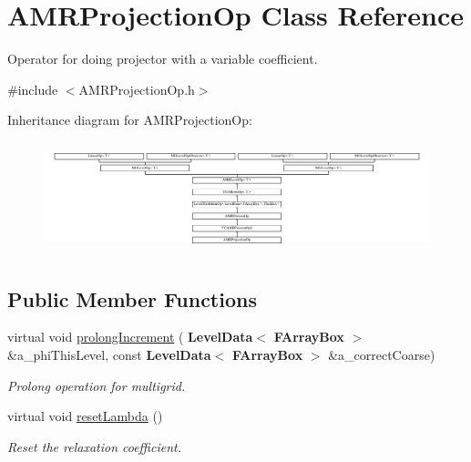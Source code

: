 \hypertarget{class_a_m_r_projection_op}{}\section{A\+M\+R\+Projection\+Op Class Reference}
\label{class_a_m_r_projection_op}


Operator for doing projector with a variable coefficient.  




{\ttfamily \#include $<$A\+M\+R\+Projection\+Op.\+h$>$}

Inheritance diagram for A\+M\+R\+Projection\+Op\+:\begin{figure}[H]
\begin{center}
\leavevmode
\includegraphics[height=3.274854cm]{class_a_m_r_projection_op}
\end{center}
\end{figure}
\subsection*{Public Member Functions}
\begin{DoxyCompactItemize}
\item 
virtual void \hyperlink{class_a_m_r_projection_op_a9a015d1c2ac019517518e88aefecb6fa}{prolong\+Increment} (\textbf{ Level\+Data}$<$ \textbf{ F\+Array\+Box} $>$ \&a\+\_\+phi\+This\+Level, const \textbf{ Level\+Data}$<$ \textbf{ F\+Array\+Box} $>$ \&a\+\_\+correct\+Coarse)
\begin{DoxyCompactList}\small\item\em Prolong operation for multigrid. \end{DoxyCompactList}\item 
\mbox{\label{class_a_m_r_projection_op_a29437ba4ff7458327bf131d1a9c4ae79}} 
virtual void \hyperlink{class_a_m_r_projection_op_a29437ba4ff7458327bf131d1a9c4ae79}{reset\+Lambda} ()
\begin{DoxyCompactList}\small\item\em Reset the relaxation coefficient. \end{DoxyCompactList}\end{DoxyCompactItemize}
